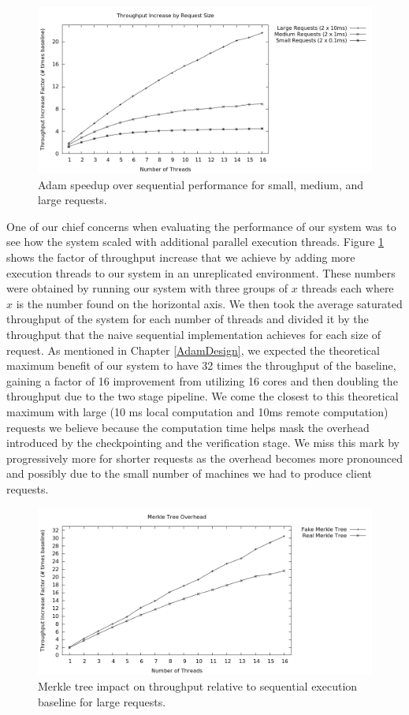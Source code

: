 \documentclass[11pt, oneside]{report}
\begin{document}
\begin{figure}[h]
\centering
\includegraphics[width=1.0\textwidth]{graphs/requestweights/graph.png}
\caption{\label{scaling}Adam speedup over sequential performance for small, medium, and large requests.}
\end{figure}

One of our chief concerns when evaluating the performance of our system was to see how the system scaled with additional parallel execution threads. Figure \ref{scaling} shows the factor of throughput increase that we achieve by adding more execution threads to our system in an unreplicated environment. 
These numbers were obtained by running our system with three groups of $x$ threads each where $x$ is the number found on the horizontal axis. 
We then took the average saturated throughput of the system for each number of threads and divided it by the throughput that the naive sequential implementation achieves for each size of request.
As mentioned in Chapter \ref{AdamDesign}, we expected the theoretical maximum benefit of our system to have 32 times the throughput of the baseline, gaining a factor of 16 improvement from utilizing 16 cores and then doubling the throughput due to the two stage pipeline.
We come the closest to this theoretical maximum with large (10 ms local computation and 10ms remote computation) requests  we believe because the computation time helps mask the overhead introduced by the checkpointing and the verification stage.
We miss this mark by progressively more for shorter requests as the overhead becomes more pronounced and possibly due to the small number of machines we had to produce client requests.

\begin{figure}[h]
\centering
\includegraphics[width=1.0\textwidth]{graphs/merkleimpact/graph.png}
\caption{\label{scalingmedmerkletree}Merkle tree impact on throughput relative to sequential execution baseline for large requests.}
\end{figure}
\end{document}
